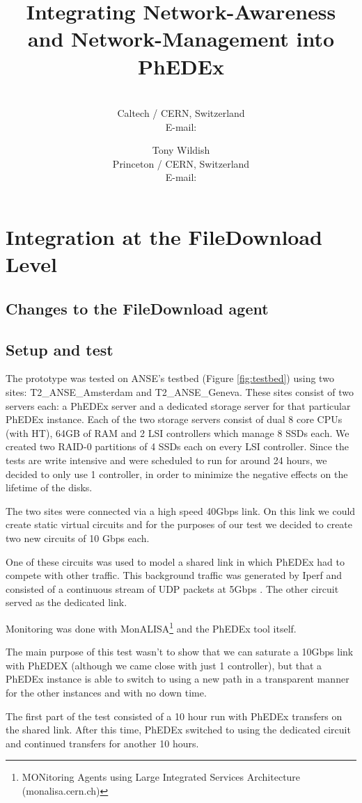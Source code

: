 \documentclass[toc]{PoS}
\title{Integrating Network-Awareness and Network-Management into PhEDEx}
\author{\speaker{Vlad Lapadatescu}\\
Caltech / CERN, Switzerland\\
E-mail: \email{vlad@cern.ch}}
\author{Tony Wildish\\
Princeton / CERN, Switzerland\\
E-mail: \email{tony.wildish@cern.ch}}
\begin{document}
\section{Integration at the FileDownload Level}

\subsection{Changes to the FileDownload agent}

\subsection{Setup and test}
The prototype was tested on ANSE's testbed (Figure \ref{fig:testbed}) using 
two sites: T2\_ANSE\_Amsterdam and T2\_ANSE\_Geneva. These sites consist of two
 servers each: a PhEDEx server and a dedicated storage server for that particular 
 PhEDEx instance. Each of the two storage servers consist of dual 8 core CPUs 
 (with HT), 64GB of RAM and 2 LSI controllers which manage 8 SSDs each. We created 
 two RAID-0 partitions of 4 SSDs each on every LSI controller. Since the tests are write 
 intensive and were scheduled to run for around 24 hours, we decided to only use 
 1 controller, in order to minimize the negative effects on the lifetime of the disks.

The two sites were connected via a high speed 40Gbps link. On this link we could create
static virtual circuits and for the purposes of our test we decided to create two new
circuits of 10 Gbps each.

One of these circuits was used to model a shared link in which PhEDEx had to compete 
with other traffic. This background traffic was generated by Iperf and consisted of a 
continuous stream of UDP packets at 5Gbps . The other circuit served as the dedicated
link.

Monitoring was done with MonALISA\footnote{MONitoring Agents using Large
 Integrated Services Architecture (monalisa.cern.ch) } and the PhEDEx tool itself.

The main purpose of this test wasn't to show that we can saturate a 10Gbps link with
PhEDEX (although we came close with just 1 controller), but that a PhEDEx instance 
is able to switch to using a new path in a transparent manner for the other instances
and with no down time. 

The first part of the test consisted of a 10 hour run with PhEDEx transfers on the 
shared link. After this time, PhEDEx switched to using the dedicated circuit and
continued transfers for another 10 hours.
\end{document}
